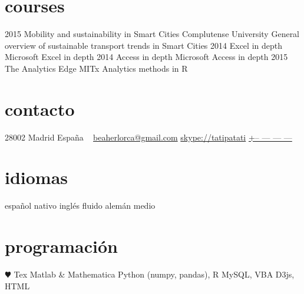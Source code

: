 \documentclass[]{friggeri-cv}
\begin{document}
\section{courses}

\begin{entrylist}
  \entry
    {2015}
    {Mobility and sustainability in Smart Cities}
    {Complutense University}
    {General overview of sustainable transport trends in Smart Cities}
  \entry
    {2014}
    {Excel in depth}
    {}
    {Microsoft Excel in depth}
  \entry
    {2014}
    {Access in depth}
    {}
    {Microsoft Access in depth}
  \entry
    {2015}
    {The Analytics Edge}
    {MITx}
    {Analytics methods in R}
\end{entrylist}




\else 

       {}


\begin{aside}
  \section{contacto}
    28002 Madrid
    España
    ~
    \href{mailto:beaherlorca@gmail.com}{beaherlorca@gmail.com}
    \href{skype:<tatipatati>[add]}{skype://tatipatati}
    \href{tel:xxxxxxxxxxx}{+-- --- --- ---}
  \section{idiomas}
    español nativo
    inglés fluido
    alemán medio
  \section{programación}
    {\color{red} $\varheartsuit$} Tex
    Matlab \& Mathematica
    Python (numpy, pandas), R
    MySQL, VBA
    D3js, HTML
\end{aside}
\end{document}
